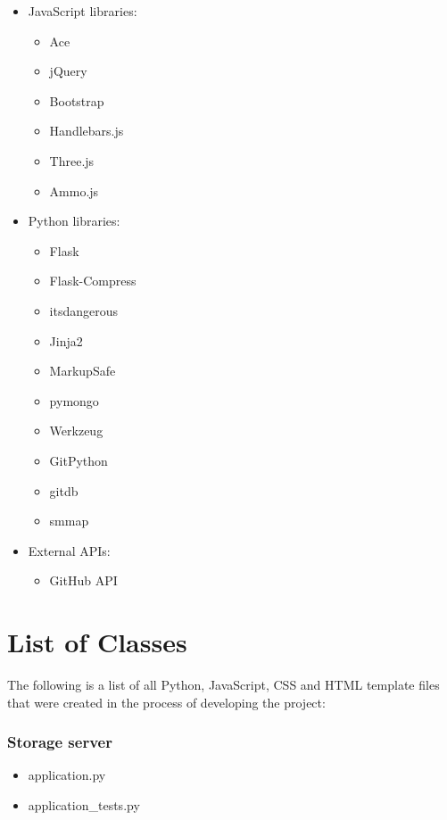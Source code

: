 \begin{itemize}
	\itemsep-0.6em
	\item JavaScript libraries:
	\begin{itemize}
		\itemsep-0.6em
		\item Ace
		\item jQuery
		\item Bootstrap
		\item Handlebars.js
		\item Three.js
		\item Ammo.js
	\end{itemize}
	
	\item Python libraries:
	\begin{itemize}
		\itemsep-0.6em
		\item Flask
		\item Flask-Compress
		\item itsdangerous
		\item Jinja2
		\item MarkupSafe
		\item pymongo
		\item Werkzeug
		\item GitPython
		\item gitdb
		\item smmap
	\end{itemize}

	\item External APIs:
	\begin{itemize}
		\itemsep-0.6em
		\item GitHub API
	\end{itemize}
\end{itemize}

\section{List of Classes}
The following is a list of all Python, JavaScript, CSS and HTML template files that were created in the process of developing the project:

\subsubsection{Storage server}
\begin{itemize}
	\itemsep-0.6em
	\item application.py
	\item application\_tests.py
\end{itemize}
